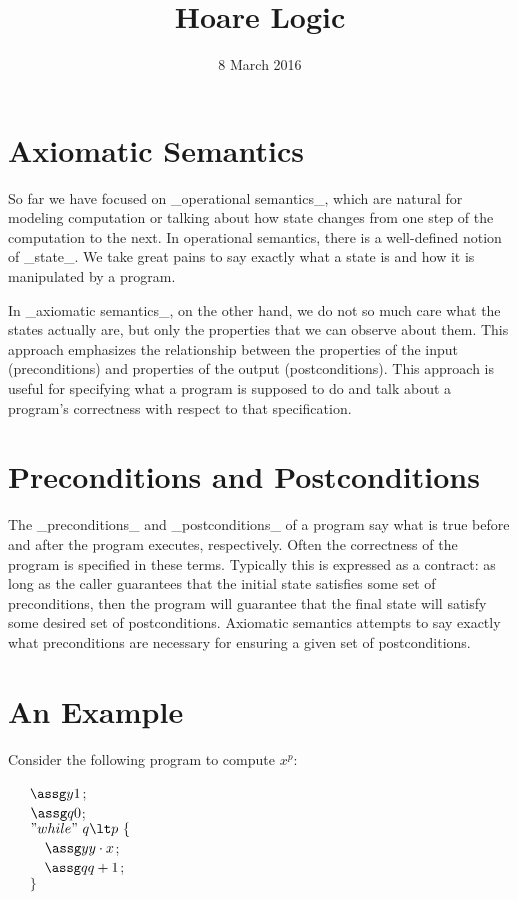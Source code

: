 \title{Hoare Logic}
\date{8 March 2016}
\maketitle

\section{Axiomatic Semantics}

So far we have focused on _operational semantics_, which are natural for
modeling computation or talking about how state changes from one step
of the computation to the next. In operational semantics, there is a
well-defined notion of _state_. We take great pains to say exactly what
a state is and how it is manipulated by a program.

In _axiomatic semantics_, on the other hand, we do not so much care what
the states actually are, but only the properties that we can observe
about them. This approach emphasizes the relationship between the properties of the
input (preconditions) and properties of the output (postconditions).
This approach is useful for specifying what a program is supposed to do and talk
about a program's correctness with respect to that specification.

\section{Preconditions and Postconditions}

The _preconditions_ and _postconditions_ of a program
say what is true before and after the program
executes, respectively. Often the correctness of the program
is specified in these terms. Typically this is expressed as a contract: as long
as the caller guarantees that the initial state satisfies some set of preconditions, then
the program will guarantee that the final state will satisfy some
desired set of postconditions. Axiomatic semantics attempts to say exactly
what preconditions are necessary for ensuring a given set of postconditions.

\section{An Example}

Consider the following program to compute $x^p$:

\medskip

\begin{flushleft}
$\phantom{ddd}\assg y1$;\\
$\phantom{ddd}\assg q0$;\\
$\phantom{ddd}"while"~q \lt p~\{$\\
$\phantom{ddddd}\assg y{y\cdot x}$;\\
$\phantom{ddddd}\assg q{q+1}$;\\
$\phantom{ddd}\}$
\end{flushleft}

